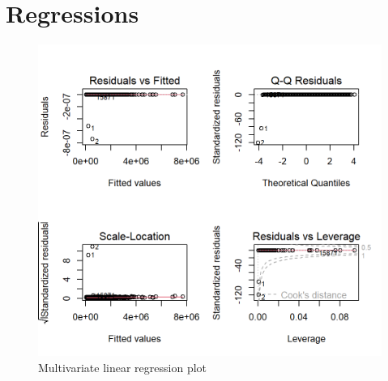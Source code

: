 \documentclass[a4paper, 12pt]{article}
\begin{document}
\section{Regressions}
\begin{figure}[H]
\includegraphics[scale=1.1]{MLR}
\centering
\caption{Multivariate linear regression plot}
\label{fig:MLR}
\end{figure}
\end{document}
